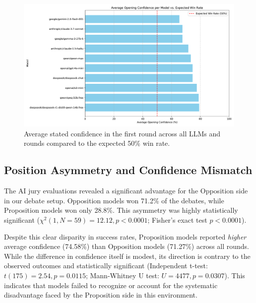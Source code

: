 \documentclass{article}
\begin{document}
\begin{figure}[h]
  \centering
  \includegraphics[width=0.8\linewidth]{figures/model_avg_opening_confidence_bar_chart.pdf}
  \caption{Average stated confidence in the first round across all LLMs and rounds compared to the expected 50\% win rate.}
  \label{fig:avg_confidence}
\end{figure}

\subsection{Position Asymmetry and Confidence Mismatch}

The AI jury evaluations revealed a significant advantage for the Opposition side in our debate setup. Opposition models won 71.2\% of the debates, while Proposition models won only 28.8\%. This asymmetry was highly statistically significant ($\chi^2(1, N=59) = 12.12, p < 0.0001$; Fisher's exact test $p < 0.0001$).

Despite this clear disparity in success rates, Proposition models reported \textit{higher} average confidence (74.58\%) than Opposition models (71.27\%) across all rounds. While the difference in confidence itself is modest, its direction is contrary to the observed outcomes and statistically significant (Independent t-test: $t(175) = 2.54, p = 0.0115$; Mann-Whitney U test: $U=4477, p = 0.0307$). This indicates that models failed to recognize or account for the systematic disadvantage faced by the Proposition side in this environment.
\end{document}
